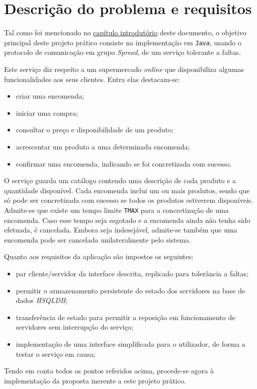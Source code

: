 \documentclass[a4paper]{report}
\begin{document}
\chapter{Descrição do problema e requisitos} \label{ch:ProblemDescriptionRequirements}
\large{
	Tal como foi mencionado no \hyperref[ch:Introduction]{capítulo introdutório} deste documento, o objetivo principal deste projeto prático consiste na implementação em \texttt{Java}, usando o protocolo de comunicação em grupo \textit{Spread}, de um serviço tolerante a faltas.

	Este serviço diz respeito a um supermercado \textit{online} que disponibiliza algumas funcionalidades aos seus clientes. Entra elas destacam-se:
	\begin{itemize}
		\item criar uma encomenda;
		\item iniciar uma compra;
		\item consultar o preço e disponibilidade de um produto;
		\item acrescentar um produto a uma determinada encomenda;
		\item confirmar uma encomenda, indicando se foi concretizada com sucesso.
	\end{itemize}

	O serviço guarda um catálogo contendo uma descrição de cada produto e a quantidade disponível.
	Cada encomenda inclui um ou mais produtos, sendo que só pode ser concretizada com sucesso se todos os produtos estiverem disponíveis.
	Admite-se que existe um tempo limite \texttt{TMAX} para a concretização de uma encomenda. Caso esse tempo seja esgotado e a encomenda ainda não tenha sido efetuada, é cancelada.  Embora seja indesejável, admite-se também que uma encomenda pode ser cancelada unilateralmente pelo sistema.

	Quanto aos requisitos da aplicação são impostos os seguintes:
	\begin{itemize}
		\item par cliente/servidor da interface descrita, replicado para tolerância a faltas;
		\item permitir o armazenamento persistente do estado dos servidores na base de dados \textit{HSQLDB};
		\item transferência de estado para permitir a reposição em funcionamento de servidores sem interrupção do serviço;
		\item implementação de uma interface simplificada para o utilizador, de forma a testar o serviço em causa;
	\end{itemize}

	Tendo em conta todos os pontos referidos acima, procede-se agora à implementação da proposta inerente a este projeto prático.
}
\end{document}
